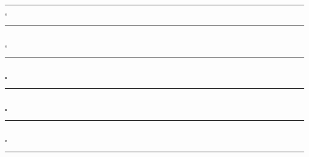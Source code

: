 \documentclass[letterpaper, 12pt]{article}
\begin{document}
\vspace{2cm}
\begin{center}
  \rule{13cm}{0.3mm}
\end{center}
\vspace{-.3cm}
\begin{center}
  $\square$\quad\vspace{1mm}\rule{11cm}{0.1mm}\vspace{1mm}\\
  $\square$\quad\vspace{1mm}\rule{11cm}{0.1mm}\vspace{1mm}\\
  $\square$\quad\vspace{1mm}\rule{11cm}{0.1mm}\vspace{1mm}\\
  $\square$\quad\vspace{1mm}\rule{11cm}{0.1mm}\vspace{1mm}\\
  $\square$\quad\vspace{1mm}\rule{11cm}{0.1mm}\vspace{1mm}
\end{center}
\end{document}
